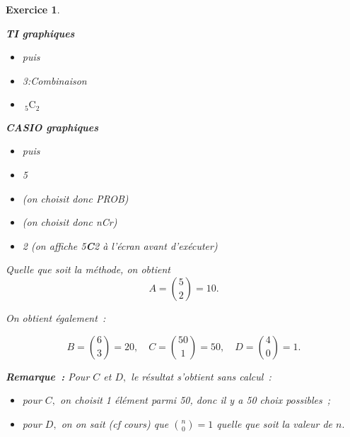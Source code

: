 \documentclass[10pt]{article}
\newtheorem{exo}{Exercice}
\begin{document}
\begin{exo}
\begin{enumerate}
\begin{itemize}
\begin{multicols}{4}
\columnbreak

\begin{center}\textbf{TI graphiques}\end{center}

\medskip


\begin{itemize}
\item[\textbullet]  puis  
\item[\textbullet] 3:Combinaison

\item[\textbullet] $~_{5}\text{C}_2$ 
\end{itemize}
\vspace*{1cm}

\columnbreak

\begin{center}\textbf{CASIO graphiques}\end{center}

\medskip


\begin{itemize}
\item[\textbullet]  puis  
\item[\textbullet] 5   \fbox{$\triangleright$}
\item[\textbullet]  (on choisit donc PROB)
\item[\textbullet]  (on choisit donc nCr)
\item[\textbullet] 2  (on affiche 5\textbf{C}2 à l'écran avant d'exécuter)
\end{itemize}






\end{multicols}
\end{itemize}

\normalsize

\medskip

Quelle que soit la méthode, on obtient \[A=\binom{5}{2}=10.\]


\medskip

On obtient également~:

\[B=\binom{6}{3}=20,\quad C=\binom{50}{1}=50,\quad D=\binom{4}{0}=1.\]

\medskip

\textbf{Remarque~:} Pour $C$ et $D,$ le résultat s'obtient sans calcul~:

\begin{itemize}
\item[\textbullet] pour $C,$ on choisit 1 élément parmi 50, donc il y a 50 choix possibles~;
\item[\textbullet] pour $D,$ on on sait (cf cours) que $\binom{n}{0}=1$ quelle que soit la valeur de $n.$
\end{itemize}


\end{enumerate}
\end{exo}
\end{document}
